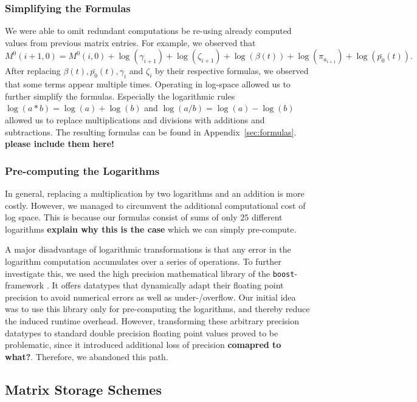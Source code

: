 \documentclass[runningheads,a4paper]{llncs}
\begin{document}
\subsubsection{Simplifying the Formulas}  
We were able to omit redundant computations be re-using already computed values from previous matrix entries.
For example, we observed that $$M^0(i+1,0) = M^0(i,0) + \log(\gamma_{i+1}) + \log(\zeta_{i+1}) + \log(\beta(t)) + \log(\pi_{a_{i+1}}) + \log(\bar{p_0}(t)).$$
After replacing $\beta(t), \bar{p_0}(t), \gamma_i$ and $\zeta_i$ by their respective formulas, we observed that some terms appear multiple times. 
Operating in log-space allowed us to further simplify the formulas. Especially the logarithmic rules $\log(a*b) = \log(a) + \log(b)$ and $\log(a/b) = \log(a) - \log(b)$ 
allowed us to replace multiplications and divisions with additions and subtractions.
The resulting formulas can be found in Appendix~\ref{sec:formulas}. {\bf please include them here!}

\subsubsection{Pre-computing the Logarithms}
In general, replacing a multiplication by two logarithms and an addition is more costly. 
However, we managed to circumvent the additional computational cost of log space. 
This is because our formulas consist of sums of only $25$ different logarithms {\bf explain why this is the case} which we can simply 
pre-compute.

A major disadvantage of logarithmic transformations is that any error in the logarithm computation accumulates over a series of operations. 
To further investigate this, we used the high precision mathematical library of the \texttt{boost}-framework \cite{boost}. 
It offers datatypes that dynamically adapt their floating point precision to avoid numerical errors as well as under-/overflow. 
Our initial idea was to use this library only for pre-computing the logarithms, and thereby reduce the induced runtime overhead. 
However, transforming these arbitrary precision datatypes to standard double precision floating point values proved to be problematic, since 
it introduced additional loss of precision {\bf comapred to what?}. Therefore,  we abandoned this path.

\subsection{Matrix Storage Schemes}
\label{sec:caching}
\end{document}
